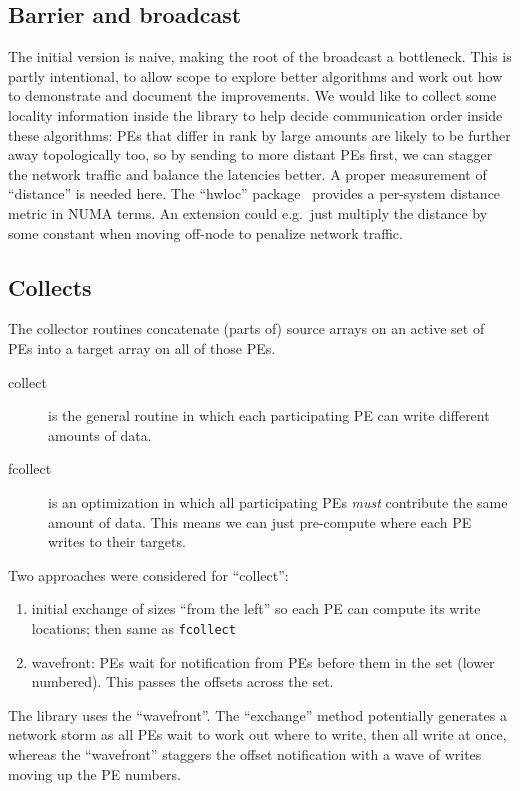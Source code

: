 \subsection{Barrier and broadcast}

The initial version is naive, making the root of the broadcast a
bottleneck.  This is partly intentional, to allow scope to explore
better algorithms and work out how to demonstrate and document the
improvements. We would like to collect some locality information
inside the library to help decide communication order inside these
algorithms: PEs that differ in rank by large amounts are likely to be
further away topologically too, so by sending to more distant PEs
first, we can stagger the network traffic and balance the latencies
better. A proper measurement of ``distance'' is needed here. The
``hwloc'' package~\cite{hwloc} provides a per-system distance metric
in NUMA terms. An extension could e.g.\ just multiply the distance by
some constant when moving off-node to penalize network traffic.

\subsection{Collects}

The collector routines concatenate (parts of) source arrays on an
active set of PEs into a target array on all of those PEs.

\begin{description}
\item[collect] is the general routine in which each participating PE
  can write different amounts of data.
\item[fcollect] is an optimization in which all participating PEs
  \emph{must} contribute the same amount of data. This means we can
  just pre-compute where each PE writes to their targets.
\end{description}

Two approaches were considered for ``collect'':

\begin{enumerate}
\item initial exchange of sizes ``from the left'' so each PE can
  compute its write locations; then same as \texttt{fcollect}
\item wavefront: PEs wait for notification from PEs before them in the
  set (lower numbered). This passes the offsets across the set.
\end{enumerate}

The library uses the ``wavefront''. The ``exchange'' method
potentially generates a network storm as all PEs wait to work out
where to write, then all write at once, whereas the ``wavefront''
staggers the offset notification with a wave of writes moving up the
PE numbers.

